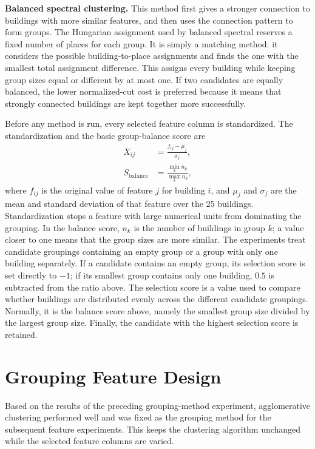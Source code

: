 \noindent\textbf{Balanced spectral clustering.}
This method first gives a stronger connection to buildings with more similar
features, and then uses the connection pattern to form groups. The Hungarian
assignment used by balanced spectral reserves a fixed number of places for each
group. It is simply a matching method: it considers the possible
building-to-place assignments and finds the one with the smallest total
assignment difference. This assigns every building while keeping group sizes
equal or different by at most one. If two candidates are equally balanced, the
lower normalized-cut cost is preferred because it means that strongly connected
buildings are kept together more successfully.

Before any method is run, every selected feature column is standardized. The
standardization and the basic group-balance score are
\begin{align}
X_{ij} &= \frac{f_{ij}-\mu_j}{\sigma_j},\\
S_{\mathrm{balance}} &= \frac{\min_k n_k}{\max_k n_k},
\end{align}
where $f_{ij}$ is the original value of feature $j$ for building $i$, and
$\mu_j$ and $\sigma_j$ are the mean and standard deviation of that feature over
the 25 buildings. Standardization stops a feature with large numerical units
from dominating the grouping. In the balance score, $n_k$ is the number of
buildings in group $k$; a value closer to one means that the group sizes are more
similar. The experiments treat candidate groupings containing an empty group or
a group with only one building separately. If a candidate contains an empty
group, its selection score is set directly to $-1$; if its smallest group contains
only one building, $0.5$ is subtracted from the ratio above. The selection score
is a value used to compare whether buildings are distributed evenly across the
different candidate groupings. Normally, it is the balance score above, namely
the smallest group size divided by the largest group size. Finally, the candidate
with the highest selection score is retained.


\section{Grouping Feature Design}

Based on the results of the preceding grouping-method experiment, agglomerative
clustering performed well and was fixed as the grouping method for the subsequent
feature experiments. This keeps the clustering algorithm unchanged while the
selected feature columns are varied.

